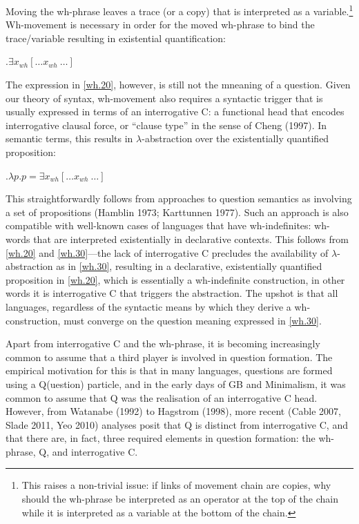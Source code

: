 \documentclass[11pt]{article}
\begin{document}
Moving the wh-phrase leaves a trace (or a copy) that is interpreted as a variable.\footnote{This raises a non-trivial issue: if links of movement chain are copies, why should the wh-phrase be interpreted as an operator at the top of the chain while it is interpreted as a variable at the bottom of the chain.} Wh-movement is necessary in order for the moved wh-phrase to bind the trace/variable resulting in existential quantification:

\ex.\label{wh.20}$\exists x_{wh}[\dots x_{wh}\ \dots]$

The expression in \ref{wh.20}, however, is still not the mneaning of a question. Given our theory of syntax, wh-movement also requires a syntactic trigger that is usually expressed in terms of an interrogative C: a functional head that encodes interrogative clausal force, or ``clause type'' in the sense of Cheng (1997). In semantic terms, this results in $\lambda$-abstraction over the existentially quantified proposition:

\ex.\label{wh.30}$\lambda p.p = \exists x_{wh}[\dots x_{wh}\ \dots]$

This straightforwardly follows from approaches to question semantics as involving a set of propositions (Hamblin 1973; Karttunnen 1977). Such an approach is also compatible with well-known cases of languages that have wh-indefinites: wh-words that are interpreted existentially in declarative contexts. This follows from \ref{wh.20} and \ref{wh.30}---the lack of interrogative C precludes the availability of $\lambda$-abstraction as in \ref{wh.30}, resulting in a declarative, existentially quantified proposition in \ref{wh.20}, which is essentially a wh-indefinite construction, in other words it is interrogative C that triggers the abstraction. The upshot is that all languages, regardless of the syntactic means by which they derive a wh-construction, must converge on the question meaning expressed in \ref{wh.30}.

Apart from interrogative C and the wh-phrase, it is becoming increasingly common to assume that a third player is involved in question formation. The empirical motivation for this is that in many languages, questions are formed using a Q(uestion) particle, and in the early days of GB and Minimalism, it was common to assume that Q was the realisation of an interrogative C head. However, from Watanabe (1992) to Hagstrom (1998), more recent (Cable 2007, Slade 2011, Yeo 2010) analyses posit that Q is distinct from interrogative C, and that there are, in fact, three required elements in question formation: the wh-phrase, Q, and interrogative C.
\end{document}
